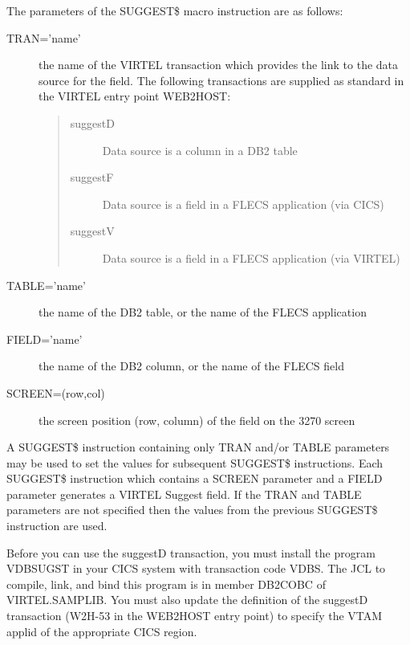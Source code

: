 \documentclass[letterpaper,10pt,english]{sphinxmanual}
\begin{document}
The parameters of the SUGGEST\$ macro instruction are as follows:
\begin{description}
\item[{TRAN=’name’}] \leavevmode
the name of the VIRTEL transaction which provides the link to the data source for the field. The following transactions are supplied as standard in the VIRTEL entry point WEB2HOST:
\begin{quote}
\begin{description}
\item[{suggestD}] \leavevmode
Data source is a column in a DB2 table

\item[{suggestF}] \leavevmode
Data source is a field in a FLECS application (via CICS)

\item[{suggestV}] \leavevmode
Data source is a field in a FLECS application (via VIRTEL)

\end{description}
\end{quote}

\item[{TABLE=’name’}] \leavevmode
the name of the DB2 table, or the name of the FLECS application

\item[{FIELD=’name’}] \leavevmode
the name of the DB2 column, or the name of the FLECS field

\item[{SCREEN=(row,col)}] \leavevmode
the screen position (row, column) of the field on the 3270 screen

\end{description}

A SUGGEST\$ instruction containing only TRAN and/or TABLE parameters may be used to set the values for subsequent
SUGGEST\$ instructions. Each SUGGEST\$ instruction which contains a SCREEN parameter and a FIELD parameter
generates a VIRTEL Suggest field. If the TRAN and TABLE parameters are not specified then the values from the
previous SUGGEST\$ instruction are used.


Before you can use the suggestD transaction, you must install the program VDBSUGST in your CICS system with
transaction code VDBS. The JCL to compile, link, and bind this program is in member DB2COBC of VIRTEL.SAMPLIB. You
must also update the definition of the suggestD transaction (W2H-53 in the WEB2HOST entry point) to specify the
VTAM applid of the appropriate CICS region.
\end{document}
